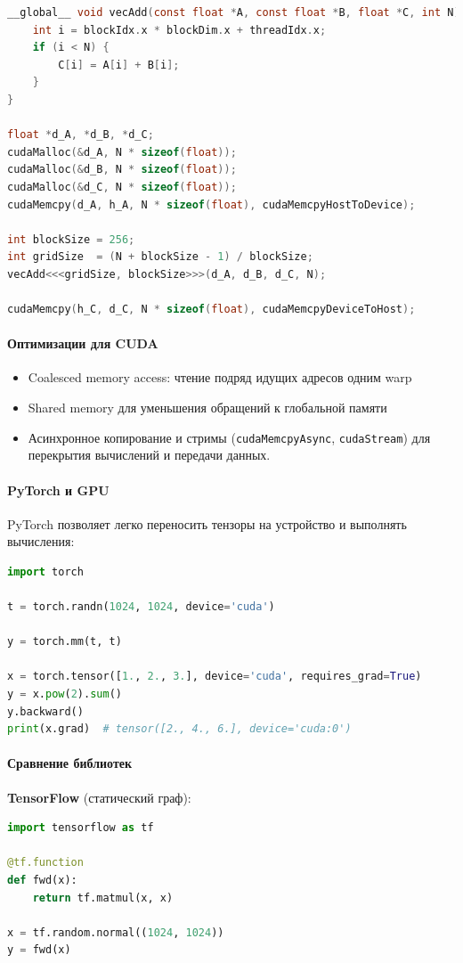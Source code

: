 \begin{lstlisting}[language=C,caption={CUDA: сложение векторов},label={lst:cuda_vecadd}]
__global__ void vecAdd(const float *A, const float *B, float *C, int N) {
    int i = blockIdx.x * blockDim.x + threadIdx.x;
    if (i < N) {
        C[i] = A[i] + B[i];
    }
}

float *d_A, *d_B, *d_C;
cudaMalloc(&d_A, N * sizeof(float));
cudaMalloc(&d_B, N * sizeof(float));
cudaMalloc(&d_C, N * sizeof(float));
cudaMemcpy(d_A, h_A, N * sizeof(float), cudaMemcpyHostToDevice);

int blockSize = 256;
int gridSize  = (N + blockSize - 1) / blockSize;
vecAdd<<<gridSize, blockSize>>>(d_A, d_B, d_C, N);

cudaMemcpy(h_C, d_C, N * sizeof(float), cudaMemcpyDeviceToHost);
\end{lstlisting}

\paragraph{Оптимизации для CUDA}
\begin{itemize}
  \item Coalesced memory access: чтение подряд идущих адресов одним warp\;
  \item Shared memory для уменьшения обращений к глобальной памяти\;
  \item Асинхронное копирование и стримы (\texttt{cudaMemcpyAsync}, \texttt{cudaStream}) для перекрытия вычислений и передачи данных.
\end{itemize}

\paragraph{PyTorch и GPU}
PyTorch позволяет легко переносить тензоры на устройство и выполнять вычисления:

\begin{lstlisting}[language=Python,caption={PyTorch: базовые операции на GPU},label={lst:torch_gpu}]
import torch

t = torch.randn(1024, 1024, device='cuda')

y = torch.mm(t, t)

x = torch.tensor([1., 2., 3.], device='cuda', requires_grad=True)
y = x.pow(2).sum()
y.backward()
print(x.grad)  # tensor([2., 4., 6.], device='cuda:0')
\end{lstlisting}

\paragraph{Сравнение библиотек}
\textbf{TensorFlow} (статический граф):
\begin{lstlisting}[language=Python,caption={TensorFlow: определение и запуск функции},label={lst:tf}]
import tensorflow as tf

@tf.function
def fwd(x):
    return tf.matmul(x, x)

x = tf.random.normal((1024, 1024))
y = fwd(x)
\end{lstlisting}

